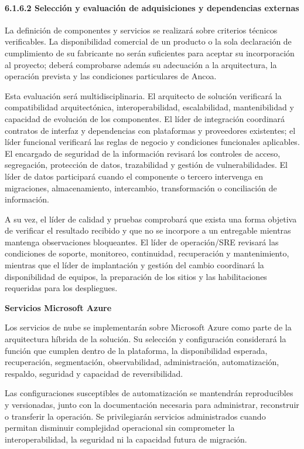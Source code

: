 \documentclass[11pt]{article}
\begin{document}
\paragraph{6.1.6.2 Selección y evaluación de adquisiciones y dependencias externas}\label{6-1-6-2-seleccion-y-evaluacion-de-adquisiciones-y-dependencias-externas}

La definición de componentes y servicios se realizará sobre criterios técnicos verificables. La disponibilidad comercial de un producto o la sola declaración de cumplimiento de su fabricante no serán suficientes para aceptar su incorporación al proyecto; deberá comprobarse además su adecuación a la arquitectura, la operación prevista y las condiciones particulares de Ancoa.

Esta evaluación será multidisciplinaria. El arquitecto de solución
verificará la compatibilidad arquitectónica, interoperabilidad,
escalabilidad, mantenibilidad y capacidad de evolución de los
componentes. El líder de integración coordinará contratos de interfaz y
dependencias con plataformas y proveedores existentes; el líder
funcional verificará las reglas de negocio y condiciones funcionales
aplicables. El encargado de seguridad de la información revisará los
controles de acceso, segregación, protección de datos, trazabilidad y
gestión de vulnerabilidades. El líder de datos participará cuando el
componente o tercero intervenga en migraciones, almacenamiento,
intercambio, transformación o conciliación de información.

A su vez, el líder de calidad y pruebas comprobará que exista una forma
objetiva de verificar el resultado recibido y que no se incorpore a un
entregable mientras mantenga observaciones bloqueantes. El líder de
operación/SRE revisará las condiciones de soporte, monitoreo,
continuidad, recuperación y mantenimiento, mientras que el líder de
implantación y gestión del cambio coordinará la disponibilidad de
equipos, la preparación de los sitios y las habilitaciones requeridas
para los despliegues.

\textbf{Servicios Microsoft Azure}

Los servicios de nube se implementarán sobre Microsoft Azure como parte
de la arquitectura híbrida de la solución. Su selección y configuración
considerará la función que cumplen dentro de la plataforma, la
disponibilidad esperada, recuperación, segmentación, observabilidad,
administración, automatización, respaldo, seguridad y capacidad de
reversibilidad.

Las configuraciones susceptibles de automatización se mantendrán
reproducibles y versionadas, junto con la documentación necesaria para
administrar, reconstruir o transferir la operación. Se privilegiarán
servicios administrados cuando permitan disminuir complejidad
operacional sin comprometer la interoperabilidad, la seguridad ni la
capacidad futura de migración.
\end{document}
